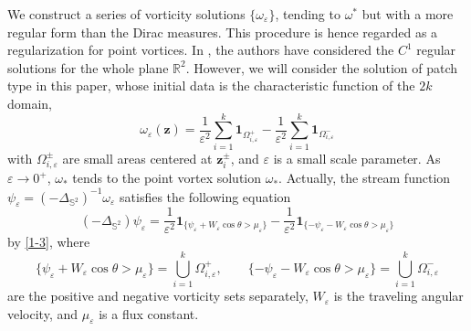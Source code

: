 \documentclass[12pt,reqno]{amsart}
\numberwithin{equation}{section}
\theoremstyle{definition}
\theoremstyle{remark}
\begin{document}
    We construct a series of vorticity solutions $\{\omega_\varepsilon\}$, tending to $\omega^*$ but with a more regular form than the Dirac measures.
    This procedure is hence regarded as a regularization for point vortices. In \cite{CQZZ}, the authors have considered the $C^1$ regular solutions 
    for the whole plane $\mathbb R^2$. However, we will consider the solution of patch type in this paper, whose initial data is the characteristic 
    function of the $2k$ domain, 
    \begin{equation*}
    	\omega_\varepsilon(\boldsymbol z)=\frac{1}{\varepsilon^2}\sum\limits_{i=1}^k\boldsymbol 1_{\Omega_{i,\varepsilon}^+}-\frac{1}{\varepsilon^2}\sum\limits_{i=1}^k\boldsymbol 1_{\Omega_{i,\varepsilon}^-}
    \end{equation*}
    with $\Omega_{i,\varepsilon}^\pm$ are small areas centered at $\boldsymbol z_i^\pm$,  and $\varepsilon$ is a small scale parameter. 
    As $\varepsilon\to 0^+$, $\omega_*$  tends to the point vortex solution $\omega_*$. 
    Actually, the stream function $\psi_\varepsilon=(-\Delta_{\mathbb S^2})^{-1}\omega_\varepsilon$ satisfies the following equation
    \begin{equation}\label{1-6}
    	(-\Delta_{\mathbb S^2})\psi_\varepsilon=\frac{1}{\varepsilon^2}\boldsymbol1_{\{\psi_\varepsilon+W_\varepsilon\cos\theta>\mu_\varepsilon\}}-\frac{1}{\varepsilon^2}\boldsymbol1_{\{-\psi_\varepsilon-W_\varepsilon\cos\theta>\mu_\varepsilon\}}
    \end{equation}
    by \eqref{1-3}, where 
    $$\{\psi_\varepsilon+W_\varepsilon\cos\theta>\mu_\varepsilon\}=\bigcup_{i=1}^k\Omega_{i,\varepsilon}^+, \quad\quad \{-\psi_\varepsilon-W_\varepsilon\cos\theta>\mu_\varepsilon\}=\bigcup_{i=1}^k\Omega_{i,\varepsilon}^-$$ 
   are the positive and negative vorticity sets separately, $W_\varepsilon$ is the traveling angular velocity, and $\mu_\varepsilon$ is a flux constant. 
   
\end{document}
